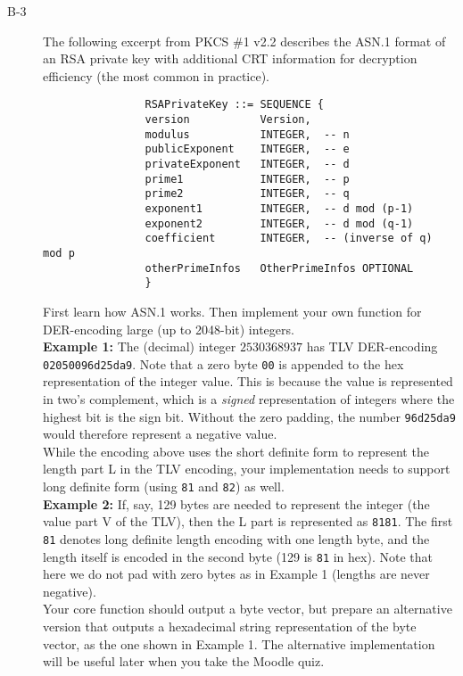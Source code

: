 \documentclass{article}
\begin{document}
\begin{description}
			\item[B-3]{The following excerpt from PKCS \#1 v2.2 describes the ASN.1 format of an RSA private key with additional CRT information for decryption efficiency (the most common in practice).
				\begin{verbatim}
				RSAPrivateKey ::= SEQUENCE {
				version           Version,
				modulus           INTEGER,  -- n
				publicExponent    INTEGER,  -- e
				privateExponent   INTEGER,  -- d
				prime1            INTEGER,  -- p
				prime2            INTEGER,  -- q
				exponent1         INTEGER,  -- d mod (p-1)
				exponent2         INTEGER,  -- d mod (q-1)
				coefficient       INTEGER,  -- (inverse of q) mod p
				otherPrimeInfos   OtherPrimeInfos OPTIONAL
				}
				\end{verbatim}
				First learn how ASN.1 works. Then implement your own function for DER-encoding large (up to 2048-bit) integers.\\
				
				\textbf{Example 1:} The (decimal) integer $2530368937$ has TLV DER-encoding \verb!02050096d25da9!. Note that a zero byte \verb!00! is appended to the hex representation of the integer value. This is because the value is represented in two's complement, which is a \textit{signed} representation of integers where the highest bit is the sign bit. Without the zero padding, the number \verb!96d25da9! would therefore represent a negative value.\\
				
				While the encoding above uses the short definite form to represent the length part L in the TLV encoding, your implementation needs to support long definite form (using \verb!81! and \verb!82!) as well.\\
				
				\textbf{Example 2:} If, say, 129 bytes are needed to represent the integer (the value part V of the TLV), then the L part is represented as \verb!8181!. The first \verb!81! denotes long definite length encoding with one length byte, and the length itself is encoded in the second byte (129 is \verb!81! in hex). Note that here we do not pad with zero bytes as in Example 1 (lengths are never negative).\\
				
				Your core function should output a byte vector, but prepare an alternative version that outputs a hexadecimal string representation of the byte vector, as the one shown in Example 1. The alternative implementation will be useful later when you take the Moodle quiz.
				
}
\end{description}
\end{document}
